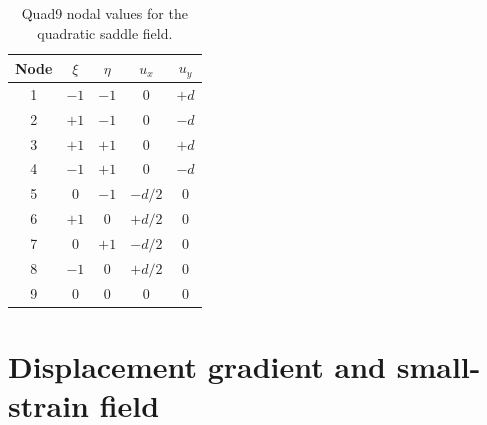 \documentclass[11pt,a4paper]{article}
\begin{document}
\begin{table}[ht]
\centering
\caption{Quad9 nodal values for the quadratic saddle field.}
\label{tab:nodes}
\renewcommand{\arraystretch}{1.2}
\begin{tabular}{ccccc}
\toprule
Node & $\xi$ & $\eta$ & $u_x$ & $u_y$\\
\midrule
1 & $-1$ & $-1$ & $0$ & $+d$\\
2 & $+1$ & $-1$ & $0$ & $-d$\\
3 & $+1$ & $+1$ & $0$ & $+d$\\
4 & $-1$ & $+1$ & $0$ & $-d$\\
5 & $0$  & $-1$ & $-d/2$ & $0$\\
6 & $+1$ & $0$  & $+d/2$ & $0$\\
7 & $0$  & $+1$ & $-d/2$ & $0$\\
8 & $-1$ & $0$  & $+d/2$ & $0$\\
9 & $0$  & $0$  & $0$ & $0$\\
\bottomrule
\end{tabular}
\end{table}

\section{Displacement gradient and small-strain field}
\end{document}
